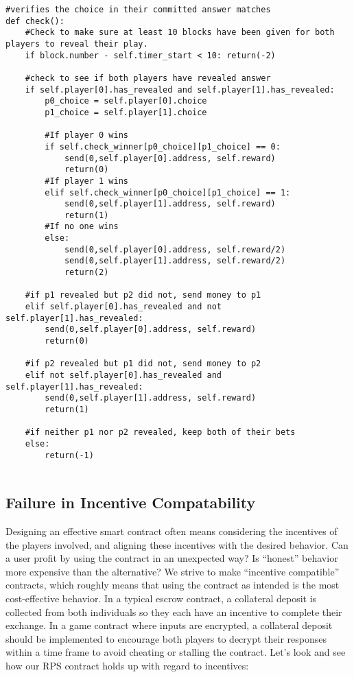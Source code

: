 \documentclass[10pt,twocolumn,letterpaper]{article}
\begin{document}
\begin{mdframed}
\begin{verbatim}
#verifies the choice in their committed answer matches
def check():
	#Check to make sure at least 10 blocks have been given for both players to reveal their play.
	if block.number - self.timer_start < 10: return(-2)

	#check to see if both players have revealed answer
	if self.player[0].has_revealed and self.player[1].has_revealed:
		p0_choice = self.player[0].choice
		p1_choice = self.player[1].choice

		#If player 0 wins
		if self.check_winner[p0_choice][p1_choice] == 0:
			send(0,self.player[0].address, self.reward)
			return(0)
		#If player 1 wins
		elif self.check_winner[p0_choice][p1_choice] == 1:
			send(0,self.player[1].address, self.reward)
			return(1)
		#If no one wins
		else:
			send(0,self.player[0].address, self.reward/2)
			send(0,self.player[1].address, self.reward/2)
			return(2)

	#if p1 revealed but p2 did not, send money to p1
	elif self.player[0].has_revealed and not self.player[1].has_revealed:
		send(0,self.player[0].address, self.reward)
		return(0)

	#if p2 revealed but p1 did not, send money to p2
	elif not self.player[0].has_revealed and self.player[1].has_revealed:
		send(0,self.player[1].address, self.reward)
		return(1)

	#if neither p1 nor p2 revealed, keep both of their bets
	else:
		return(-1)
		
\end{verbatim}
\end{mdframed}

\subsection{Failure in Incentive Compatability}
Designing an effective smart contract often means considering the incentives of the players involved, and aligning these incentives with the desired behavior. Can a user profit by using the contract in an unexpected way? Is ``honest'' behavior more expensive than the alternative?  We strive to make ``incentive compatible'' contracts, which roughly means that using the contract as intended is the most cost-effective behavior. In a typical escrow contract, a collateral deposit is collected from both individuals so they each have an incentive to complete their exchange. In a game contract where inputs are encrypted, a collateral deposit should be implemented to encourage both players to decrypt their responses within a time frame to avoid cheating or stalling the contract.  Let's look and see how our RPS contract holds up with regard to incentives:
\end{document}
